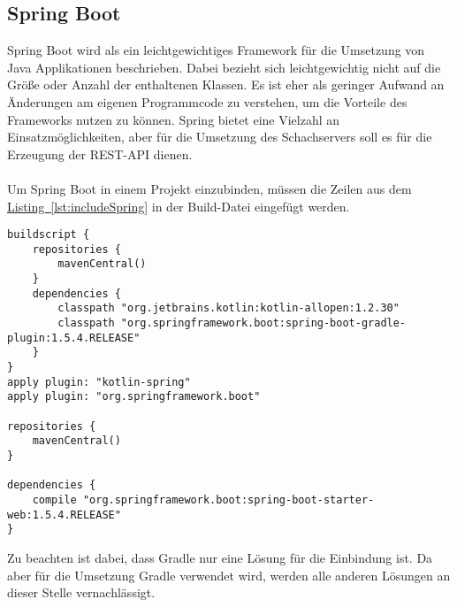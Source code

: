 \subsection{Spring Boot}\label{sec:bibspring}
Spring Boot wird als ein leichtgewichtiges Framework für die Umsetzung von Java Applikationen beschrieben. Dabei bezieht sich leichtgewichtig nicht auf die Größe oder Anzahl der enthaltenen Klassen. Es ist eher als geringer Aufwand an Änderungen am eigenen Programmcode zu verstehen, um die Vorteile des Frameworks nutzen zu können. \cite{proSpring5} Spring bietet eine Vielzahl an Einsatzmöglichkeiten, aber für die Umsetzung des Schachservers soll es für die Erzeugung der \gls{REST}-\gls{API} dienen.\\
\\
Um Spring Boot in einem Projekt einzubinden, müssen die Zeilen aus dem \hyperref[lst:includeSpring]{Listing~\ref{lst:includeSpring}} in der Build-Datei  eingefügt werden.
\begin{lstlisting}[style=lstStyleFramed, language=Gradle, caption={Einbindung des Spring Framework mittels Gradle}, label=lst:includeSpring, float]
buildscript {
	repositories {
		mavenCentral()
	}
	dependencies {
		classpath "org.jetbrains.kotlin:kotlin-allopen:1.2.30"
		classpath "org.springframework.boot:spring-boot-gradle-plugin:1.5.4.RELEASE"
	}
}
apply plugin: "kotlin-spring"
apply plugin: "org.springframework.boot"

repositories {
	mavenCentral()
}

dependencies {
	compile "org.springframework.boot:spring-boot-starter-web:1.5.4.RELEASE"
}
\end{lstlisting}
Zu beachten ist dabei, dass Gradle nur eine Lösung für die Einbindung ist. Da aber für die Umsetzung Gradle verwendet wird, werden alle anderen Lösungen an dieser Stelle vernachlässigt.\\
\\ 
